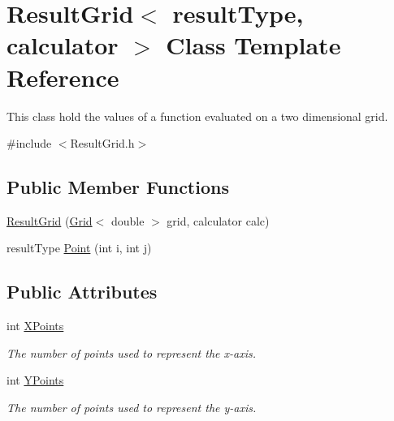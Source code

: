 \hypertarget{class_result_grid}{}\section{Result\+Grid$<$ result\+Type, calculator $>$ Class Template Reference}
\label{class_result_grid}


This class hold the values of a function evaluated on a two dimensional grid.  




{\ttfamily \#include $<$Result\+Grid.\+h$>$}

\subsection*{Public Member Functions}
\begin{DoxyCompactItemize}
\item 
\hyperlink{class_result_grid_a9ba2da6df1f07b6a96250376ed89094d}{Result\+Grid} (\hyperlink{class_grid}{Grid}$<$ double $>$ grid, calculator calc)
\item 
result\+Type \hyperlink{class_result_grid_ac9bb7d6af4293ac18302e3e895f00081}{Point} (int i, int j)
\end{DoxyCompactItemize}
\subsection*{Public Attributes}
\begin{DoxyCompactItemize}
\item 
\hypertarget{class_result_grid_ac20f44d6320de3f28e8b9041fa8a0a5e}{}int \hyperlink{class_result_grid_ac20f44d6320de3f28e8b9041fa8a0a5e}{X\+Points}\label{class_result_grid_ac20f44d6320de3f28e8b9041fa8a0a5e}

\begin{DoxyCompactList}\small\item\em The number of points used to represent the x-\/axis. \end{DoxyCompactList}\item 
\hypertarget{class_result_grid_af0886625e1133e4fe7d72c04a472ff67}{}int \hyperlink{class_result_grid_af0886625e1133e4fe7d72c04a472ff67}{Y\+Points}\label{class_result_grid_af0886625e1133e4fe7d72c04a472ff67}

\begin{DoxyCompactList}\small\item\em The number of points used to represent the y-\/axis. \end{DoxyCompactList}\end{DoxyCompactItemize}


